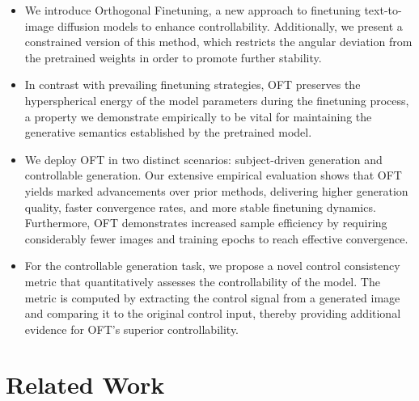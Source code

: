 \begin{itemize}[leftmargin=*,nosep]

    \item We introduce Orthogonal Finetuning, a new approach to finetuning text-to-image diffusion models to enhance controllability. Additionally, we present a constrained version of this method, which restricts the angular deviation from the pretrained weights in order to promote further stability.
    \item In contrast with prevailing finetuning strategies, OFT preserves the hyperspherical energy of the model parameters during the finetuning process, a property we demonstrate empirically to be vital for maintaining the generative semantics established by the pretrained model.
    \item We deploy OFT in two distinct scenarios: subject-driven generation and controllable generation. Our extensive empirical evaluation shows that OFT yields marked advancements over prior methods, delivering higher generation quality, faster convergence rates, and more stable finetuning dynamics. Furthermore, OFT demonstrates increased sample efficiency by requiring considerably fewer images and training epochs to reach effective convergence.
    \item For the controllable generation task, we propose a novel control consistency metric that quantitatively assesses the controllability of the model. The metric is computed by extracting the control signal from a generated image and comparing it to the original control input, thereby providing additional evidence for OFT’s superior controllability.
\end{itemize}

\section{Related Work}


